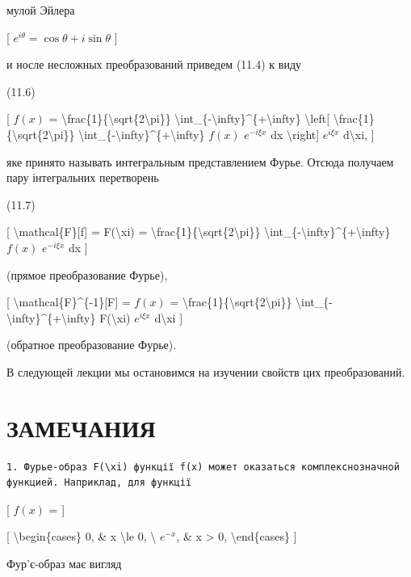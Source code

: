 \documentclass[
]{article}
\begin{document}
{{мулой Эйлера

{[} \(e^{i\theta} = \cos \theta + i \sin \theta\) {]}

и носле несложных преобразований приведем (11.4) к виду

(11.6)

{[} \(f(x)\) =
\textbackslash frac\{1\}\{\textbackslash sqrt\{2\textbackslash pi\}\}
\textbackslash int\_\{-\textbackslash infty\}\^{}\{+\textbackslash infty\}
\textbackslash left{[}
\textbackslash frac\{1\}\{\textbackslash sqrt\{2\textbackslash pi\}\}
\textbackslash int\_\{-\textbackslash infty\}\^{}\{+\textbackslash infty\}
\(f(x)\) \(e^{-i\xi x}\) dx \textbackslash right{]} \(e^{i\xi x}\)
d\textbackslash xi, {]}

яке принято называть интегральным представлением Фурье. Отсюда получаем
пару інтегральних перетворень

(11.7)

{[} \textbackslash mathcal\{F\}{[}f{]} = F(\textbackslash xi) =
\textbackslash frac\{1\}\{\textbackslash sqrt\{2\textbackslash pi\}\}
\textbackslash int\_\{-\textbackslash infty\}\^{}\{+\textbackslash infty\}
\(f(x)\) \(e^{-i\xi x}\) dx {]}

(прямое преобразование Фурье),

{[} \textbackslash mathcal\{F\}\^{}\{-1\}{[}F{]} = \(f(x)\) =
\textbackslash frac\{1\}\{\textbackslash sqrt\{2\textbackslash pi\}\}
\textbackslash int\_\{-\textbackslash infty\}\^{}\{+\textbackslash infty\}
F(\textbackslash xi) \(e^{i\xi x}\) d\textbackslash xi {]}

(обратное преобразование Фурье).

В следующей лекции мы остановимся на изучении свойств цих
преобразований.

\section{ЗАМЕЧАНИЯ}\label{ux437ux430ux43cux435ux447ux430ux43dux438ux44f}

\begin{verbatim}
1. Фурье-образ F(\xi) функції f(x) может оказаться комплекснозначной функцией. Наприклад, для функції
\end{verbatim}

{[} \(f(x)\) = {]}

{[} \textbackslash begin\{cases\} 0, \& x \textbackslash le 0,
\textbackslash{} \(e^{-x}\), \& x \textgreater{} 0,
\textbackslash end\{cases\} {]}

Фур'є-образ має вигляд

}}
\end{document}
